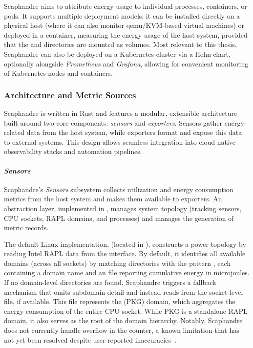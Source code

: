 Scaphandre aims to attribute energy usage to individual processes, containers, or pods. It supports multiple deployment models: it can be installed directly on a physical host (where it can also monitor qemu/KVM-based virtual machines) or deployed in a container, measuring the energy usage of the host system, provided that the  and  directories are mounted as volumes. Most relevant to this thesis, Scaphandre can also be deployed on a Kubernetes cluster via a Helm chart, optionally alongside \textit{Prometheus} and \textit{Grafana}, allowing for convenient monitoring of Kubernetes nodes and containers.

\subsubsection{Architecture and Metric Sources}
\label{sec:scaphandre-architecture}

Scaphandre is written in Rust and features a modular, extensible architecture built around two core components: \textit{sensors} and \textit{exporters}. Sensors gather energy-related data from the host system, while exporters format and expose this data to external systems. This design allows seamless integration into cloud-native observability stacks and automation pipelines.

\paragraph{\textit{Sensors}}

Scaphandre’s \textit{Sensors} subsystem collects utilization and energy consumption metrics from the host system and makes them available to exporters. An abstraction layer, implemented in , manages system topology (tracking sensors, CPU sockets, RAPL domains, and processes) and manages the generation of metric records.

The default Linux implementation,  (located in ), constructs a power topology by reading Intel RAPL data from the  interface. By default, it identifies all available domains (across all sockets) by matching directories with the pattern , each containing a domain name and an  file reporting cumulative energy in microjoules. If no domain-level directories are found, Scaphandre triggers a fallback mechanism that omits subdomain detail and instead reads from the socket-level file, if available. This file represents the  (PKG) domain, which aggregates the energy consumption of the entire CPU socket. While PKG is a standalone RAPL domain, it also serves as the root of the domain hierarchy. Notably, Scaphandre does not currently handle overflow in the  counter, a known limitation that has not yet been resolved despite user-reported inaccuracies~\cite{scaphandre_issue280}.

